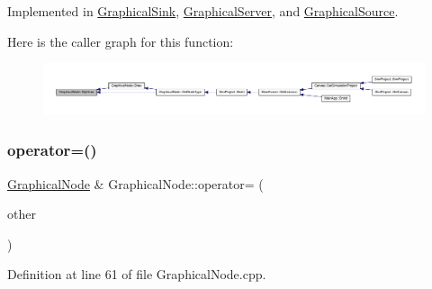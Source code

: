 Implemented in \hyperlink{class_graphical_sink_abac58f5bfe23ab2a799560171c036507}{Graphical\+Sink}, \hyperlink{class_graphical_server_ad144b6cfdf945981fd0db425dfc41e5b}{Graphical\+Server}, and \hyperlink{class_graphical_source_af01b1de06f0e6653edd60b59a279b154}{Graphical\+Source}.

Here is the caller graph for this function\+:
\nopagebreak
\begin{figure}[H]
\begin{center}
\leavevmode
\includegraphics[width=350pt]{class_graphical_node_a4a5d4f48454a9721a940499d4f59b0ce_icgraph}
\end{center}
\end{figure}
\mbox{\label{class_graphical_node_a9c5dc1b7f344e2785531318167c2826b}} 
\subsubsection{\texorpdfstring{operator=()}{operator=()}}
{\footnotesize\ttfamily \hyperlink{class_graphical_node}{Graphical\+Node} \& Graphical\+Node\+::operator= (\begin{DoxyParamCaption}\item[{const \hyperlink{class_graphical_node}{Graphical\+Node} \&}]{other }\end{DoxyParamCaption})}



Definition at line 61 of file Graphical\+Node.\+cpp.

